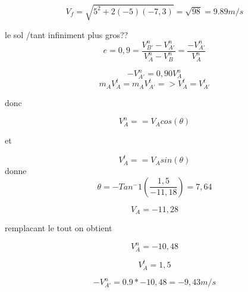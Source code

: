 \documentclass{article}
\begin{document}
\begin{equation}
V_{f} = \sqrt{5^2+2(-5)(-7,3)} = \sqrt{98} = 9.89 m/s
\end{equation}

le sol /tant infiniment plus gros??
\begin{equation}
e = 0,9 = \frac{V_{B'}^n -V_{A'}^n}{V_{A}^n -V_{B}^n} = \frac{-V_{A'}^n}{V_{A}^n}
\end{equation}

\begin{equation}
-V_{A'}^n = 0,90 V_{A}^n
\end{equation}
\begin{equation}
m_{A}V_{A}^t = m_{A}V_{A'}^t => V_{A}^t = V_{A'}^t
\end{equation}
\begin{center}
donc
\end{center}
\begin{equation}
V_{A}^n = = V_{A} cos(\theta)

\end{equation}
\begin{center}
et
\end{center}
\begin{equation}
V_{A}^t = = V_{A} sin(\theta)
\end{equation}
donne
\begin{equation}
\theta =- Tan^-1(\frac{1,5}{-11,18}) = 7,64
\end{equation}

\begin{equation}
V_{A} = -11,28
\end{equation}
\begin{center}
remplacant le tout on obtient
\end{center}

\begin{equation}
V_{A}^n =-10,48
\end{equation}

\begin{equation}
V_{A}^t = 1,5
\end{equation}

\begin{equation}
-V_{A'}^n =0.9*-10,48 = -9,43m/s
\end{equation}
\end{document}

